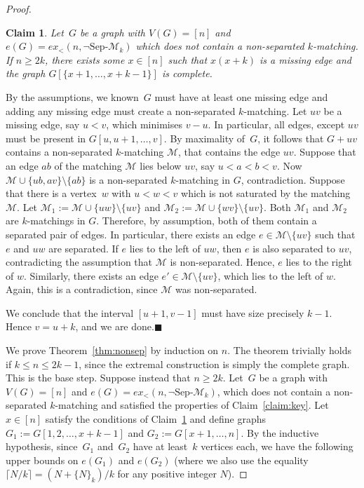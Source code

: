 \documentclass[11pt]{article}
\newtheorem{claim}[theorem]{Claim}
\theoremstyle{definition}
\newcommand{\qedclaim}{\hfill$\blacksquare$}
\newenvironment{proofclaim}{\removelastskip\penalty55\medskip\noindent{\it Proof of the claim. }}{\medskip}
\begin{document}
\begin{proof}
    \begin{claim}\label{below_comp}
        Let~$G$ be a graph with $V(G)=[n]$ and $e(G)=ex_<(n,\neg\text{Sep-}\mathcal M_k)$ which does not contain a non-separated $k$-matching.
        If $n\ge2k$, there exists some $x\in[n]$ such that $x(x+k)$ is a missing edge and the graph $G[\{x+1,\dots,x+k-1\}]$ is complete.
    \end{claim}
    \begin{proofclaim}
        By the assumptions, we known~$G$ must have at least one missing edge and adding any missing edge must create a non-separated $k$-matching.
        Let $uv$ be a missing edge, say $u<v$, which minimises $v-u$.
        In particular, all edges, except $uv$ must be present in $G[u,u+1,\dots,v]$.
        By maximality of~$G$, it follows that $G+uv$ contains a non-separated $k$-matching $\mathcal M$, that contains the edge $uv$.
        Suppose that an edge $ab$ of the matching $\mathcal M$ lies below $uv$, say $u<a<b<v$.
        Now $\mathcal M\cup\{ub,av\}\setminus\{ab\}$ is a non-separated $k$-matching in $G$, contradiction.
        Suppose that there is a vertex~$w$ with $u<w<v$ which is not saturated by the matching $\mathcal M$.
        Let $\mathcal M_1:=\mathcal M\cup\{uw\}\setminus\{uv\}$ and $\mathcal M_2:=\mathcal M\cup\{wv\}\setminus\{uv\}$.
        Both $\mathcal M_1$ and $\mathcal M_2$ are $k$-matchings in $G$.
        Therefore, by assumption, both of them contain a separated pair of edges.
        In particular, there exists an edge $e\in\mathcal M\setminus\{uv\}$ such that $e$ and $uw$ are separated.
        If $e$ lies to the left of $uw$, then $e$ is also separated to $uv$, contradicting the assumption that $\mathcal M$ is non-separated.
        Hence, $e$ lies to the right of $w$.
        Similarly, there exists an edge $e'\in\mathcal M\setminus\{uv\}$, which lies to the left of $w$.
        Again, this is a contradiction, since $\mathcal M$ was non-separated.

        We conclude that the interval $[u+1,v-1]$ must have size precisely $k-1$.
        Hence $v=u+k$, and we are done.\qedclaim
    \end{proofclaim}

    We prove Theorem~\ref{thm:nonsep} by induction on $n$.
    The theorem trivially holds if $k\le n\le 2k-1$, since the extremal construction is simply the complete graph.
    This is the base step.
    Suppose instead that $n\ge 2k$.
    Let~$G$ be a graph with $V(G)=[n]$ and $e(G)=ex_<(n,\neg\text{Sep-}\mathcal M_k)$, which does not contain a non-separated $k$-matching and satisfied the properties of Claim~\ref{claim:key}.
    Let~$x\in[n]$ satisfy the conditions of Claim~\ref{below_comp} and define graphs $G_1:=G[1,2,\dots,x{+}k-1]$ and $G_2:=G[x{+}1,\dots,n]$.
    By the inductive hypothesis, since~$G_1$ and~$G_2$ have at least~$k$ vertices each, we have the following upper bounds on $e(G_1)$ and $e(G_2)$ (where we also use the equality $\lceil N/k\rceil=(N+\{N\}_k)/k$ for any positive integer $N$).


\end{proof}
\end{document}
